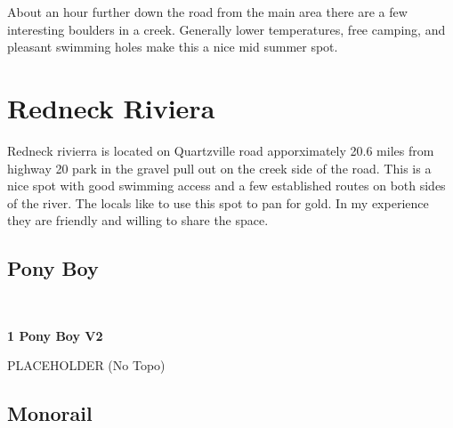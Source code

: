 \begin{multicols}{2}
\begin{minipage}{\columnwidth}
About an hour further down the road from the main area there are a few interesting boulders in a creek. Generally lower temperatures, free camping, and pleasant swimming holes make this a nice mid summer spot.
\end{minipage}

\newpage
		\section{Redneck Riviera}\label{sa:Redneck Riviera}
	\begin{minipage}{\columnwidth}
	Redneck rivierra is located on Quartzville road apporximately 20.6 miles from highway 20 park in the gravel pull out on the creek side of the road. This is a nice spot with good swimming access and a few established routes on both sides of the river. The locals like to use this spot to pan for gold. In my experience they are friendly and willing to share the space.
	\end{minipage}
			\subsection*{Pony Boy}\label{bf:Pony Boy}
			\begin{minipage}{\columnwidth}
			\
			\end{minipage}
			
					\begin{minipage}{\linewidth}	
					\label{rt:Pony Boy}
\colorbox{green!20}{
\parbox{0.95\textwidth}{
\textbf{
1 Pony Boy V2  
}
}
}

					\begin{adjustwidth}{0.5cm}{}				
					PLACEHOLDER
						\newline (No Topo) 
					\end{adjustwidth}
					\end{minipage}
			\subsection*{Monorail}\label{bf:Monorail}
			\begin{minipage}{\columnwidth}
			\
			\end{minipage}
			

\end{multicols}
